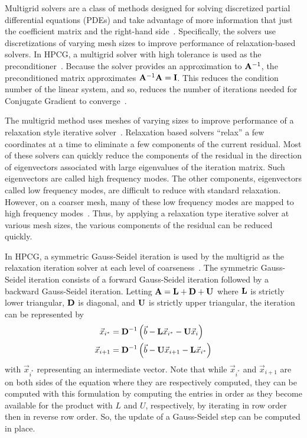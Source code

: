 Multigrid solvers are a class of methods designed for solving discretized partial differential equations (PDEs) and take advantage of more information that just the coefficient matrix and the right-hand side~\cite{Saad:2003:IterativeMethods}.
Specifically, the solvers use discretizations of varying mesh sizes to improve performance of relaxation-based solvers.
In HPCG, a multigrid solver with high tolerance is used as the preconditioner~\cite{Dongarra:2015:HPCG}.
Because the solver provides an approximation to \(\mathbf{A}^{-1}\), the preconditioned matrix approximates \(\mathbf{A}^{-1}\mathbf{A} = \mathbf{I}\).\textsl{}
This reduces the condition number of the linear system, and so, reduces the number of iterations needed for Conjugate Gradient to converge~\cite{Saad:2003:IterativeMethods}.

The multigrid method uses meshes of varying sizes to improve performance of a relaxation style iterative solver~\cite{Saad:2003:IterativeMethods}.
Relaxation based solvers ``relax'' a few coordinates at a time to eliminate a few components of the current residual.
Most of these solvers can quickly reduce the components of the residual in the direction of eigenvectors associated with large eigenvalues of the iteration matrix.
Such eigenvectors are called high frequency modes.
The other components, eigenvectors called low frequency modes, are difficult to reduce with standard relaxation.
However, on a coarser mesh, many of these low frequency modes are mapped to high frequency modes~\cite{Saad:2003:IterativeMethods}.
Thus, by applying a relaxation type iterative solver at various mesh sizes, the various components of the residual can be reduced quickly.

In HPCG, a symmetric Gauss-Seidel iteration is used by the multigrid as the relaxation iteration solver at each level of coarseness~\cite{Dongarra:2015:HPCG}.
The symmetric Gauss-Seidel iteration consists of a forward Gauss-Seidel iteration followed by a backward Gauss-Seidel iteration.
Letting \(\mathbf{A} = \mathbf{L}+\mathbf{D}+\mathbf{U}\) where \(\mathbf{L}\) is strictly lower triangular, \(\mathbf{D}\) is diagonal, and \(\mathbf{U}\) is strictly upper triangular, the iteration can be represented by
\begin{align*}
	\vec{x}_{i^*}   &= \mathbf{D}^{-1}\left(\vec{b} - \mathbf{L}\vec{x}_{i^*} - \mathbf{U}\vec{x}_i\right) \\
	\vec{x}_{i+1} &= \mathbf{D}^{-1}\left(\vec{b} - \mathbf{U}\vec{x}_{i+1} - \mathbf{L}\vec{x}_{i^*}\right)
\end{align*}
with \(\vec{x}_{i^*}\) representing an intermediate vector.
Note that while \(\vec{x}_{i^*}\) and \(\vec{x}_{i+1}\) are on both sides of the equation where they are respectively computed, they can be computed with this formulation by computing the entries in order as they become available for the product with \(L\) and \(U\), respectively, by iterating in row order then in reverse row order.  So, the update of a Gauss-Seidel step can be computed in place.
